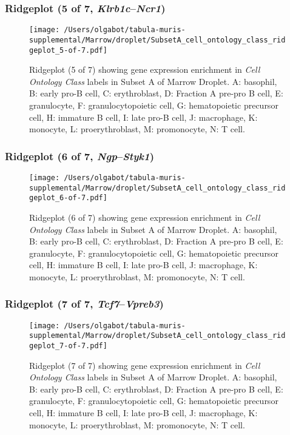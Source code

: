 \clearpage

\subsubsection{Ridgeplot (5 of 7, \emph{Klrb1c}--\emph{Ncr1})}
\begin{figure}[h]
\centering
\texttt{[image: /Users/olgabot/tabula-muris-supplemental/Marrow/droplet/SubsetA\_cell\_ontology\_class\_ridgeplot\_5-of-7.pdf]}

\caption{ Ridgeplot (5 of 7)  showing gene expression enrichment in \emph{Cell Ontology Class} labels in Subset A of Marrow Droplet. A: basophil, B: early pro-B cell, C: erythroblast, D: Fraction A pre-pro B cell, E: granulocyte, F: granulocytopoietic cell, G: hematopoietic precursor cell, H: immature B cell, I: late pro-B cell, J: macrophage, K: monocyte, L: proerythroblast, M: promonocyte, N: T cell.}
\end{figure}


\clearpage

\subsubsection{Ridgeplot (6 of 7, \emph{Ngp}--\emph{Styk1})}
\begin{figure}[h]
\centering
\texttt{[image: /Users/olgabot/tabula-muris-supplemental/Marrow/droplet/SubsetA\_cell\_ontology\_class\_ridgeplot\_6-of-7.pdf]}

\caption{ Ridgeplot (6 of 7)  showing gene expression enrichment in \emph{Cell Ontology Class} labels in Subset A of Marrow Droplet. A: basophil, B: early pro-B cell, C: erythroblast, D: Fraction A pre-pro B cell, E: granulocyte, F: granulocytopoietic cell, G: hematopoietic precursor cell, H: immature B cell, I: late pro-B cell, J: macrophage, K: monocyte, L: proerythroblast, M: promonocyte, N: T cell.}
\end{figure}


\clearpage

\subsubsection{Ridgeplot (7 of 7, \emph{Tcf7}--\emph{Vpreb3})}
\begin{figure}[h]
\centering
\texttt{[image: /Users/olgabot/tabula-muris-supplemental/Marrow/droplet/SubsetA\_cell\_ontology\_class\_ridgeplot\_7-of-7.pdf]}

\caption{ Ridgeplot (7 of 7)  showing gene expression enrichment in \emph{Cell Ontology Class} labels in Subset A of Marrow Droplet. A: basophil, B: early pro-B cell, C: erythroblast, D: Fraction A pre-pro B cell, E: granulocyte, F: granulocytopoietic cell, G: hematopoietic precursor cell, H: immature B cell, I: late pro-B cell, J: macrophage, K: monocyte, L: proerythroblast, M: promonocyte, N: T cell.}
\end{figure}


